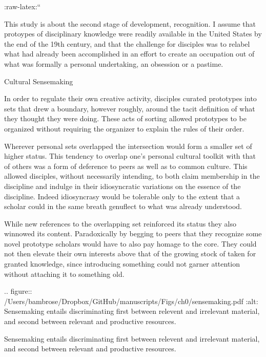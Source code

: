 :raw-latex:``

This study is about the second stage of development, recognition. I
assume that protoypes of disciplinary knowledge were readily available
in the United States by the end of the 19th century, and that the
challenge for disciples was to relabel what had already been
accomplished in an effort to create an occupation out of what was
formally a personal undertaking, an obsession or a pastime.

Cultural Sensemaking
~~~~~~~~~~~~~~~~~~~~

In order to regulate their own creative activity, disciples curated
prototypes into sets that drew a boundary, however roughly, around the
tacit definition of what they thought they were doing. These acts of
sorting allowed prototypes to be organized without requiring the
organizer to explain the rules of their order.

Wherever personal sets overlapped the intersection would form a smaller
set of higher status. This tendency to overlap one's personal cultural
toolkit with that of others was a form of deference to peers as well as
to common culture. This allowed disciples, without necessarily
intending, to both claim membership in the discipline and indulge in
their idiosyncratic variations on the essence of the discipline. Indeed
idiosyncrasy would be tolerable only to the extent that a scholar could
in the same breath genuflect to what was already understood.

While new references to the overlapping set reinforced its status they
also winnowed its content. Paradoxically by begging to peers that they
recognize some novel prototype scholars would have to also pay homage to
the core. They could not then elevate their own interests above that of
the growing stock of taken for granted knowledge, since introducing
something could not garner attention without attaching it to something
old.

.. figure:: /Users/bambrose/Dropbox/GitHub/manuscripts/Figs/ch0/sensemaking.pdf
   :alt: Sensemaking entails discriminating first between relevent and
   irrelevant material, and second between relevant and productive
   resources.

   Sensemaking entails discriminating first between relevent and
   irrelevant material, and second between relevant and productive
   resources.


